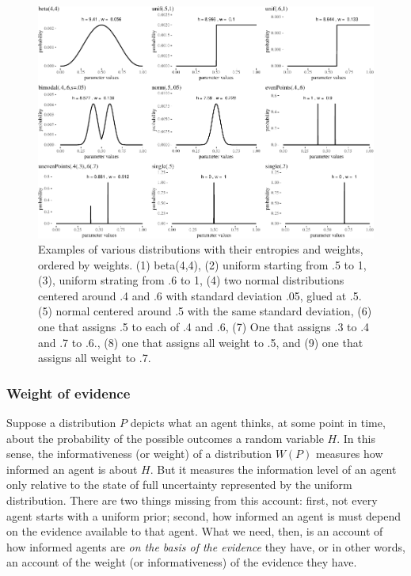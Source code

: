 \documentclass[
  10pt,
  dvipsnames,enabledeprecatedfontcommands]{scrartcl}
\begin{document}
\begin{figure}[H]

\begin{center}\includegraphics[width=1\linewidth]{chapter-outline_files/figure-latex/fig:weightsWeird-1} \end{center}
\caption{Examples of various distributions with their entropies and weights, ordered by weights. (1) beta(4,4), (2) uniform starting from .5 to 1, (3), uniform strating from .6 to 1, (4) two normal distributions centered around .4 and .6 with standard deviation .05, glued at .5. (5) normal centered around .5 with the same standard deviation, (6) one that assigns .5 to each of .4  and .6, (7) One that assigns .3 to .4 and .7 to .6., (8) one that assigns all weight to .5, and (9) one that assigns all weight to .7.}

\label{fig:weightsWeird}
\end{figure}

\hypertarget{weight-of-evidence-1}{%
\subsubsection{Weight of evidence}\label{weight-of-evidence-1}}

Suppose a distribution \(P\) depicts what an agent thinks, at some point
in time, about the probability of the possible outcomes a random
variable \(H\). In this sense, the informativeness (or weight) of a
distribution \(W(P)\) measures how informed an agent is about \(H\). But
it measures the information level of an agent only relative to the state
of full uncertainty represented by the uniform distribution. There are
two things missing from this account: first, not every agent starts with
a uniform prior; second, how informed an agent is must depend on the
evidence available to that agent. What we need, then, is an account of
how informed agents are \textit{on the basis of the evidence} they have,
or in other words, an account of the weight (or informativeness) of the
evidence they have.
\end{document}

